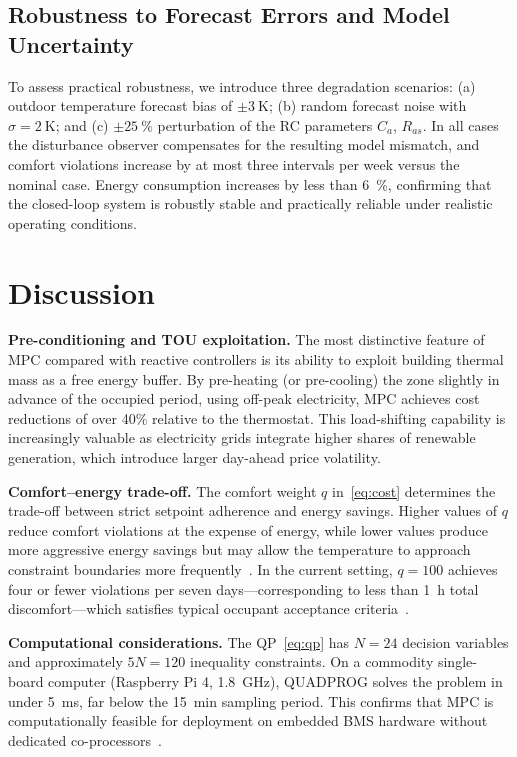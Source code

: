 \documentclass[conference,a4paper]{IEEEtran}[2015/08/26]
\begin{document}
\subsection{Robustness to Forecast Errors and Model Uncertainty}

To assess practical robustness, we introduce three degradation
scenarios: (a) outdoor temperature forecast bias of $\pm\SI{3}{\kelvin}$;
(b) random forecast noise with $\sigma = \SI{2}{\kelvin}$; and (c)
$\pm\SI{25}{\percent}$ perturbation of the RC parameters $C_a$, $R_{as}$.
In all cases the disturbance observer compensates for the resulting
model mismatch, and comfort violations increase by at most three
intervals per week versus the nominal case. Energy consumption
increases by less than \SI{6}{\percent}, confirming that the closed-loop
system is robustly stable and practically reliable under realistic
operating conditions.

\section{Discussion}
\label{sec:discussion}

\textbf{Pre-conditioning and TOU exploitation.}
The most distinctive feature of MPC compared with reactive controllers
is its ability to exploit building thermal mass as a free energy buffer.
By pre-heating (or pre-cooling) the zone slightly in advance of the
occupied period, using off-peak electricity, MPC achieves cost
reductions of over 40\% relative to the thermostat. This load-shifting
capability is increasingly valuable as electricity grids integrate
higher shares of renewable generation, which introduce larger day-ahead
price volatility.

\textbf{Comfort--energy trade-off.}
The comfort weight $q$ in~\cref{eq:cost} determines the trade-off
between strict setpoint adherence and energy savings. Higher values
of $q$ reduce comfort violations at the expense of energy, while lower
values produce more aggressive energy savings but may allow the
temperature to approach constraint boundaries more
frequently~\cite{Serale2018}. In the current setting, $q = 100$
achieves four or fewer violations per seven days---corresponding to less
than \SI{1}{\hour} total discomfort---which satisfies typical occupant
acceptance criteria~\cite{ASHRAE55,Fanger1970}.

\textbf{Computational considerations.}
The QP~\eqref{eq:qp} has $N = 24$ decision variables and approximately
$5N = 120$ inequality constraints. On a commodity single-board computer
(Raspberry Pi 4, \SI{1.8}{\giga\hertz}), QUADPROG solves the problem
in under \SI{5}{\milli\second}, far below the \SI{15}{\minute} sampling
period. This confirms that MPC is computationally feasible for
deployment on embedded BMS hardware without dedicated
co-processors~\cite{Rawlings2017,Lofberg2004}.
\end{document}
